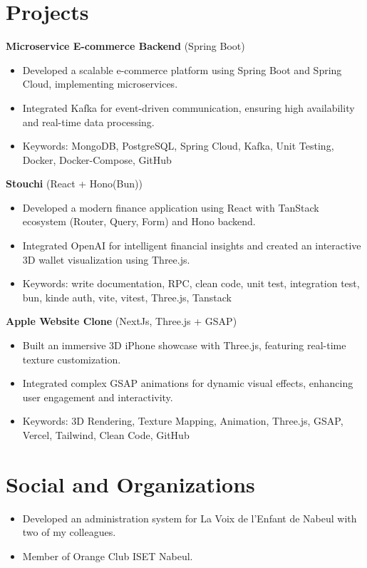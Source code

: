 \documentclass[11pt,letterpaper]{article}
\begin{document}
\section{Projects}
\textbf{Microservice E-commerce Backend} (Spring Boot)
\begin{itemize}[leftmargin=*, itemsep=1pt]
    \item Developed a scalable e-commerce platform using Spring Boot and Spring Cloud, implementing microservices.
    \item Integrated Kafka for event-driven communication, ensuring high availability and real-time data processing.
    \item Keywords: MongoDB, PostgreSQL, Spring Cloud, Kafka, Unit Testing, Docker, Docker-Compose, GitHub
\end{itemize}

\textbf{Stouchi} (React + Hono(Bun))
\begin{itemize}[leftmargin=*, itemsep=1pt]
    \item Developed a modern finance application using React with TanStack ecosystem (Router, Query, Form) and Hono backend.
    \item Integrated OpenAI for intelligent financial insights and created an interactive 3D wallet visualization using Three.js.
    \item Keywords: write documentation, RPC, clean code, unit test, integration test, bun, kinde auth, vite, vitest, Three.js, Tanstack
\end{itemize}

\textbf{Apple Website Clone} (NextJs, Three.js + GSAP)
\begin{itemize}[leftmargin=*, itemsep=1pt]
    \item Built an immersive 3D iPhone showcase with Three.js, featuring real-time texture customization.
    \item Integrated complex GSAP animations for dynamic visual effects, enhancing user engagement and interactivity.
    \item Keywords: 3D Rendering, Texture Mapping, Animation, Three.js, GSAP, Vercel, Tailwind, Clean Code, GitHub
\end{itemize}

\section{Social and Organizations}
\begin{itemize}[leftmargin=*, itemsep=1pt]
    \item Developed an administration system for La Voix de l’Enfant de Nabeul with two of my colleagues.
    \item Member of Orange Club ISET Nabeul.
\end{itemize}
\end{document}

